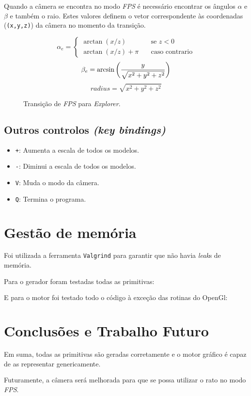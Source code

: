 \documentclass[a4paper]{article}
\begin{document}
Quando a câmera se encontra no modo \textit{FPS} é necessário encontrar os ângulos $\alpha$ e $\beta$ e também o raio. Estes valores definem o vetor correspondente às coordenadas (\texttt{(x,y,z)}) da câmera no momento da transição.

\begin{figure}[H]
    \[
        \alpha_e =
        \begin{cases}
            \arctan(x / z)       & \quad \text{se } z < 0\\
            \arctan(x / z) + \pi & \quad \text{caso contrario}
        \end{cases}
    \]
    \[
        \beta_e = \arcsin\bigg(\frac{y}{\sqrt{x^2 + y^2 + z^2}}\bigg)\\
    \]
    \[
        radius = \sqrt{x^2 + y^2 + z^2}
    \]
    \caption{Transição de \textit{FPS} para \textit{Explorer}.}
\end{figure}

\subsection{Outros controlos \textit{(key bindings)}}

\begin{itemize}
    \item \texttt{+}: Aumenta a escala de todos os modelos.
    \item \texttt{-}: Diminui a escala de todos os modelos.
    \item \texttt{V}: Muda o modo da câmera.
    \item \texttt{Q}: Termina o programa.
\end{itemize}

\section{Gestão de memória}

Foi utilizada a ferramenta \texttt{Valgrind} para garantir que não havia \textit{leak}s de memória.

Para o gerador foram testadas todas as primitivas:



E para o motor foi testado todo o código à exceção das rotinas do OpenGl:



\section{Conclusões e Trabalho Futuro}
Em suma, todas as primitivas são geradas corretamente e o motor gráfico é capaz de as representar genericamente.

Futuramente, a câmera será melhorada para que se possa utilizar o rato no modo \textit{FPS}.
\end{document}
